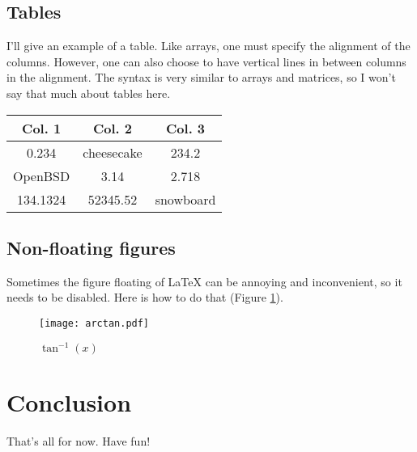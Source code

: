 \documentclass[11pt,letterpaper]{article}
\begin{document}
\subsection{Tables}

I'll give an example of a table. Like arrays, one must specify the alignment of
the columns. However, one can also choose to have vertical lines in between
columns in the alignment. The syntax is very similar to arrays and matrices, so
I won't say that much about tables here. \\

\begin{center}
\begin{tabular}{| c | c | c |}
    \hline %
    Col. 1 & Col. 2 & Col. 3 \\
    \hline
    0.234  & cheesecake & 234.2 \\
    \hline
    OpenBSD & 3.14 & 2.718 \\
    \hline
    134.1324 & 52345.52 & snowboard \\
    \hline
\end{tabular}
\end{center}

\subsection{Non-floating figures}

Sometimes the figure floating of LaTeX can be annoying and inconvenient, so it
needs to be disabled. Here is how to do that (Figure \ref{arctan}).

\begin{figure}[!htbp]
    \centering
    \texttt{[image: arctan.pdf]}
    \caption{$\tan^{-1}(x)$}
    \label{arctan}
\end{figure}

\section{Conclusion}

That's all for now. Have fun!


{}

\end{document}
